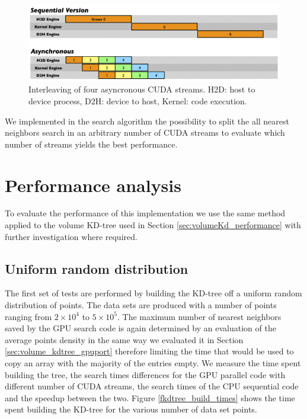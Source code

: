 \begin{figure}
\includegraphics[width=\textwidth]{fkdtree/cuda_streams.png}
\caption{Interleaving of four asyncronous CUDA streams. H2D: host to device process, D2H: device to host, Kernel: code execution.}
\label{cuda_streams}
\end{figure}

We implemented in the search algorithm the possibility to split the all nearest neighbors search in an arbitrary number of CUDA streams to evaluate which number of streams yields the best performance.\\

\section{Performance analysis}
To evaluate the performance of this implementation we use the same method applied to the volume KD-tree used in Section \ref{sec:volumeKd_performance} with further investigation where required.\\

\subsection{Uniform random distribution}
The first set of tests are performed by building the KD-tree off a uniform random distribution of points. The data sets are produced with a number of points ranging from $2 \times 10^4$ to $5 \times 10^5$. The maximum number of nearest neighbors saved by the GPU search code is again determined by an evaluation of the average points density in the same way we evaluated it in Section \ref{sec:volume_kdtree_gpuport} therefore limiting the time that would be used to copy an array with the majority of the entries empty.
We measure the time spent building the tree, the search times differences for the GPU parallel code with different number of CUDA streams, the search times of the CPU sequential code and the speedup between the two.
Figure \ref{fkdtree_build_times} shows the time spent building the KD-tree for the various number of data set points.

